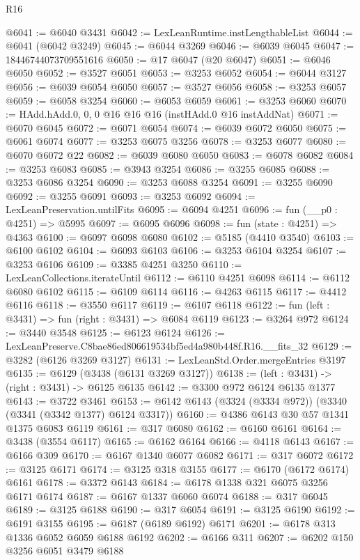 \begin{lexlean}{R16}
\begin{coremodule}
@6041 := @6040 @3431
@6042 := LexLeanRuntime.instLengthableList
@6044 := @6041 (@6042 @3249)
@6045 := @6044 @3269
@6046 := @6039 @6045
@6047 := 18446744073709551616
@6050 := @17 @6047 (@20 @6047)
@6051 := @6046 @6050
@6052 := @3527 @6051
@6053 := @3253 @6052
@6054 := @6044 @3127
@6056 := @6039 @6054 @6050
@6057 := @3527 @6056
@6058 := @3253 @6057
@6059 := @6058 @3254
@6060 := @6053 @6059
@6061 := @3253 @6060
@6070 := HAdd.hAdd.{0, 0, 0} @16 @16 @16 (instHAdd.{0} @16 instAddNat)
@6071 := @6070 @6045
@6072 := @6071 @6054
@6074 := @6039 @6072 @6050
@6075 := @6061 @6074
@6077 := @3253 @6075 @3256
@6078 := @3253 @6077
@6080 := @6070 @6072 @22
@6082 := @6039 @6080 @6050
@6083 := @6078 @6082
@6084 := @3253 @6083
@6085 := @3943 @3254
@6086 := @3255 @6085
@6088 := @3253 @6086 @3254
@6090 := @3253 @6088 @3254
@6091 := @3255 @6090
@6092 := @3255 @6091
@6093 := @3253 @6092
@6094 := LexLeanPreservation.untilFits
@6095 := @6094 @4251
@6096 := fun (__p0 : @4251) => @5995
@6097 := @6095 @6096
@6098 := fun (state : @4251) => @4363
@6100 := @6097 @6098 @6080
@6102 := @5185 (@4410 @3540)
@6103 := @6100 @6102
@6104 := @6093 @6103
@6106 := @3253 @6104 @3254
@6107 := @3253 @6106
@6109 := @3385 @4251 @3250
@6110 := LexLeanCollections.iterateUntil
@6112 := @6110 @4251 @6098
@6114 := @6112 @6080 @6102
@6115 := @6109 @6114
@6116 := @4263 @6115
@6117 := @4412 @6116
@6118 := @3550 @6117
@6119 := @6107 @6118
@6122 := fun (left : @3431) => fun (right : @3431) => @6084 @6119
@6123 := @3264 @972
@6124 := @3440 @3548
@6125 := @6123 @6124
@6126 := LexLeanPreserve.C8bae86ed806619534bf5ed4a980b448f.R16.__fits_32
@6129 := @3282 (@6126 @3269 @3127)
@6131 := LexLeanStd.Order.mergeEntries @3197
@6135 := @6129 (@3438 (@6131 @3269 @3127))
@6138 := (left : @3431) -> (right : @3431) -> @6125 @6135
@6142 := @3300 @972 @6124 @6135 @1377
@6143 := @3722 @3461
@6153 := @6142 @6143 (@3324 (@3334 @972)) (@3340 (@3341 (@3342 @1377) @6124 @3317))
@6160 := @4386 @6143 @30 @57 @1341 @1375 @6083 @6119
@6161 := @317 @6080
@6162 := @6160 @6161
@6164 := @3438 (@3554 @6117)
@6165 := @6162 @6164
@6166 := @4118 @6143
@6167 := @6166 @309
@6170 := @6167 @1340 @6077 @6082
@6171 := @317 @6072
@6172 := @3125 @6171
@6174 := @3125 @318 @3155
@6177 := @6170 (@6172 @6174) @6161
@6178 := @3372 @6143
@6184 := @6178 @1338 @321 @6075 @3256 @6171 @6174
@6187 := @6167 @1337 @6060 @6074
@6188 := @317 @6045
@6189 := @3125 @6188
@6190 := @317 @6054
@6191 := @3125 @6190
@6192 := @6191 @3155
@6195 := @6187 (@6189 @6192) @6171
@6201 := @6178 @313 @1336 @6052 @6059 @6188 @6192
@6202 := @6166 @311
@6207 := @6202 @150 @3256 @6051 @3479 @6188

\end{coremodule}
\end{lexlean}
